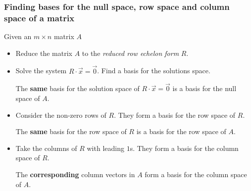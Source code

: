 \begin{frame}[fragile]
\frametitle{Finding bases for the null space, row space and column space of a matrix}

Given an $m \times n$ matrix $A$

\begin{itemize}

\item Reduce the matrix $A$ to the {\em reduced row echelon form} $R$.



\item Solve the system $R \cdot \vec{x} = \vec{0}$. Find a basis for the solutions space.

 The \textbf{same} basis for the solution space of $R \cdot \vec{x} = \vec{0}$ is a basis for the null space of $A$.
 


\item Consider the non-zero rows of $R$. They form a basis for the row space of $R$.

The \textbf{same} basis for the row space of $R$ is a basis for the row space of $A$.



\item Take the columns of $R$ with leading $1$s. They form a basis for the column space of $R$.

The \textbf{corresponding} column vectors in $A$  form a basis for the column space of $A$.

\end{itemize}

\end{frame}

